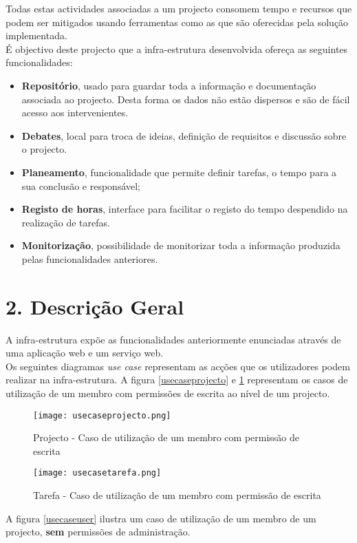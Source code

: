\documentclass[]{article}
\begin{document}
Todas estas actividades associadas a um projecto consomem tempo e recursos que podem ser mitigados usando ferramentas como as que são oferecidas pela solução implementada.\\

É objectivo deste projecto que a infra-estrutura desenvolvida ofereça as seguintes funcionalidades:
\begin{itemize}
\item
\textbf{Repositório}, usado para guardar toda a informação e documentação associada ao projecto. Desta forma os dados não estão dispersos e são de fácil acesso aos intervenientes.
\item
\textbf{Debates}, local para troca de ideias, definição de requisitos e discussão sobre o projecto.
\item
\textbf{Planeamento}, funcionalidade que permite definir tarefas, o tempo para a sua conclusão e responsável;
\item
\textbf{Registo de horas}, interface para facilitar o registo do tempo despendido na realização de tarefas.
\item
\textbf{Monitorização}, possibilidade de monitorizar toda a informação produzida pelas funcionalidades anteriores. 

\end{itemize}
\section{2.  Descrição Geral}
A infra-estrutura expõe as funcionalidades anteriormente enunciadas através de uma aplicação web e um serviço web.\\

Os seguintes diagramas \emph{use case} representam as acções que os utilizadores podem realizar na infra-estrutura. A figura \ref{usecaseprojecto} e \ref{usecasetarefa} representam os casos de utilização de um membro com permissões de escrita ao nível de um projecto.

\begin{figure}[!h]
\texttt{[image: usecaseprojecto.png]}
\caption{Projecto - Caso de utilização de um membro com permissão de escrita}
\label{usecaseprojecto}
\texttt{[image: usecasetarefa.png]}
\caption{Tarefa - Caso de utilização de um membro com permissão de escrita}
\label{usecasetarefa}
\end{figure}
A figura \ref{usecaseuser} ilustra um caso de utilização de um membro de um projecto,
\textbf{sem} permissões de administração.\\
\end{document}
